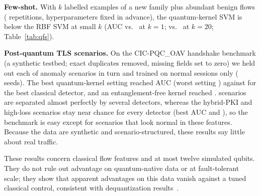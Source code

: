 \IfFileExists{IEEEtran.cls}{\documentclass[conference]{IEEEtran}}{\documentclass[10pt,twocolumn]{article}\usepackage[margin=0.8in]{geometry}}
\newcommand{\fit}[1]{\resizebox{\ifdim\width>\columnwidth\columnwidth\else\width\fi}{!}{#1}}
\begin{document}
\begin{table}[t]\centering\caption{Leave-one-family-out zero-day detection, benign-only training. FPR@95: false-positive rate at 95\% true-positive rate (lower is better).}\label{tab:qzd}\small\fit{}\end{table}

\textbf{Few-shot.} With $k$ labelled examples of a new family plus abundant benign flows (\fsReps{} repetitions, hyperparameters fixed in advance), the quantum-kernel SVM is below the RBF SVM at small $k$ (AUC \fsQkOne{} vs.\ \fsRbfOne{} at $k=1$; \fsQkTwenty{} vs.\ \fsRbfTwenty{} at $k=20$; Table~\ref{tab:qfs}).

\begin{table}[t]\centering\caption{Few-shot detection of an unseen family: AUC by number of labelled attack flows $k$.}\label{tab:qfs}\small\fit{}\end{table}

\textbf{Post-quantum TLS scenarios.} On the CIC-PQC\_OAV handshake benchmark (a synthetic testbed; exact duplicates removed, missing fields set to zero) we held out each of \pqcFamilies{} anomaly scenarios in turn and trained on normal sessions only (\pqcSeeds{} seeds). The best quantum-kernel setting reached AUC \pqcQkBest{} (worst setting \pqcQkWorst{}) against \pqcClassBest{} for the best classical detector, and an entanglement-free kernel reached \pqcNoEnt{}. \pqcEasyShare{} scenarios are separated almost perfectly by several detectors, whereas the hybrid-PKI and high-loss scenarios stay near chance for every detector (best AUC \pqcHardPki{} and \pqcHardLoss{}), so the benchmark is easy except for scenarios that look normal in these features. Because the data are synthetic and scenario-structured, these results say little about real traffic.

These results concern classical flow features and at most twelve simulated qubits. They do not rule out advantage on quantum-native data or at fault-tolerant scale; they show that apparent advantages on this data vanish against a tuned classical control, consistent with dequantization results~\cite{tang2019quantum}.
\end{document}
